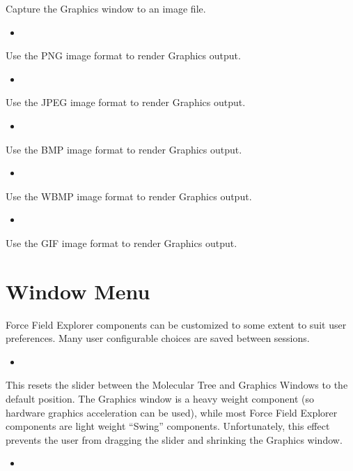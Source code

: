 \documentclass[letterpaper,11pt,english]{sphinxmanual}
\begin{document}
Capture the Graphics window to an image file.
\begin{itemize}
\item {} 

\end{itemize}

Use the PNG image format to render Graphics output.
\begin{itemize}
\item {} 

\end{itemize}

Use the JPEG image format to render Graphics output.
\begin{itemize}
\item {} 

\end{itemize}

Use the BMP image format to render Graphics output.
\begin{itemize}
\item {} 

\end{itemize}

Use the WBMP image format to render Graphics output.
\begin{itemize}
\item {} 

\end{itemize}

Use the GIF image format to render Graphics output.


\section{Window Menu}
\label{\detokenize{text/menus:window-menu}}
Force Field Explorer components can be customized to some extent to suit user preferences. Many user configurable choices are saved between sessions.
\begin{itemize}
\item {} 

\end{itemize}

This resets the slider between the Molecular Tree and Graphics Windows to the default position. The Graphics window is a heavy weight component (so hardware graphics acceleration can be used), while most Force Field Explorer components are light weight “Swing” components. Unfortunately, this effect prevents the user from dragging the slider and shrinking the Graphics window.
\begin{itemize}
\item {} 

\end{itemize}
\end{document}
